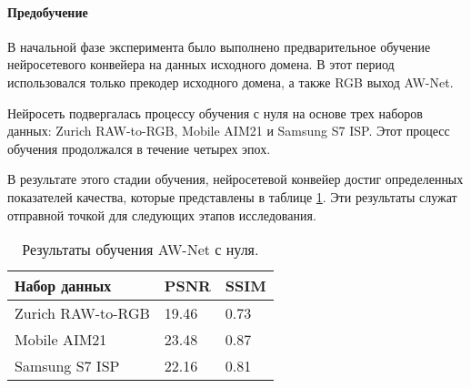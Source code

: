 \paragraph{Предобучение}

В начальной фазе эксперимента было выполнено предварительное обучение нейросетевого конвейера на данных исходного домена. В этот период использовался только прекодер исходного домена, а также RGB выход AW-Net.

Нейросеть подвергалась процессу обучения с нуля на основе трех наборов данных: Zurich RAW-to-RGB, Mobile AIM21 и Samsung S7 ISP. Этот процесс обучения продолжался в течение четырех эпох.

В результате этого стадии обучения, нейросетевой конвейер достиг определенных показателей качества, которые представлены в таблице \ref{tab:from-zoro}. Эти результаты служат отправной точкой для следующих этапов исследования.

\begin{table}[H]
    \caption{Результаты обучения AW-Net с нуля.}\label{tab:from-zoro}
    \begin{tabular}{|p{5cm}|p{3cm}|p{3cm}|}
        \hline
        {Набор данных} & {PSNR} & {SSIM} \\
        \hline
        Zurich RAW-to-RGB & 19.46 & 0.73 \\
        \hline
        Mobile AIM21 & 23.48 & 0.87 \\
        \hline
        Samsung S7 ISP & 22.16 & 0.81 \\
        \hline
    \end{tabular}
\end{table}